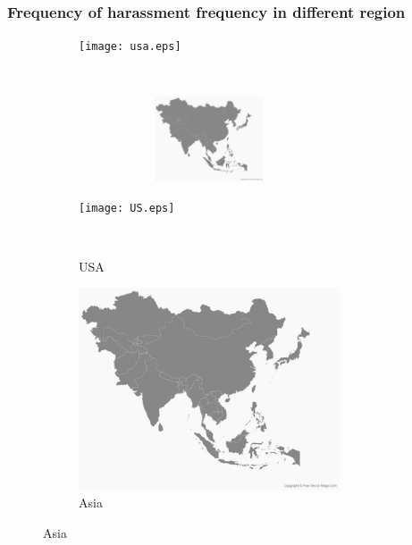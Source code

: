 \documentclass{beamer}
\begin{document}
 \begin{frame}
    \frametitle{Frequency of  harassment frequency in different region}
        \begin{figure}[h]
        \centering
        \begin{subfigure}{0.35\textwidth}
            \texttt{[image: usa.eps]}
       
        \end{subfigure}
        ~
    \begin{subfigure}{0.35\textwidth}
        \includegraphics[width=0.85\textwidth,height=2.5cm,width=3.3cm]{asia.eps}
   
    \end{subfigure}
 
        \begin{subfigure}{0.4\textwidth}
        \texttt{[image: US.eps]}
        \caption{USA}
        ~
        \end{subfigure}
        \begin{subfigure}{0.4\textwidth}
        \includegraphics[width=0.85\textwidth,height=3.5
        cm]{Asia.eps}
        \caption{Asia}
    \end{subfigure}        
    \end{figure}
   
 
 \end{frame}
 
 
 
\end{document}

